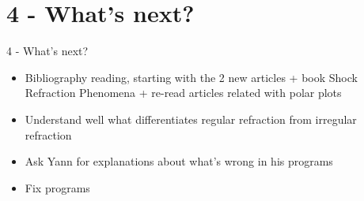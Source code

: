 \documentclass{beamer}
\begin{document}
\section{4 - What's next?}

\begin{frame}{4 - What's next?}

\begin{itemize}
\item Bibliography reading, starting with the 2 new articles + book Shock Refraction Phenomena + re-read articles related with polar plots
\item Understand well what differentiates regular refraction from irregular refraction 
\item Ask Yann for explanations about what's wrong in his programs
\item Fix programs
\end{itemize}

\end{frame}
\end{document}
